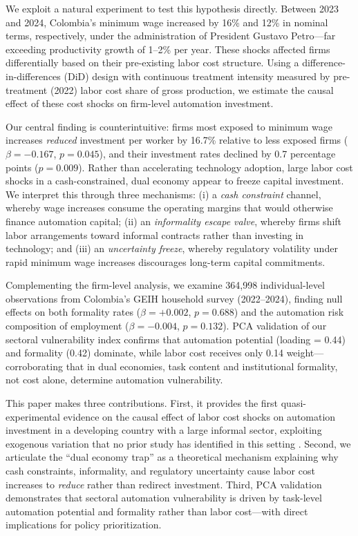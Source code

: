 \documentclass[5p,times,authoryear]{elsarticle}
\begin{document}
We exploit a natural experiment to test this hypothesis directly. Between 2023 and 2024, Colombia's minimum wage increased by 16\% and 12\% in nominal terms, respectively, under the administration of President Gustavo Petro---far exceeding productivity growth of 1--2\% per year. These shocks affected firms differentially based on their pre-existing labor cost structure. Using a difference-in-differences (DiD) design with continuous treatment intensity measured by pre-treatment (2022) labor cost share of gross production, we estimate the causal effect of these cost shocks on firm-level automation investment.

Our central finding is counterintuitive: firms most exposed to minimum wage increases \emph{reduced} investment per worker by 16.7\% relative to less exposed firms ($\beta = -0.167$, $p = 0.045$), and their investment rates declined by 0.7 percentage points ($p = 0.009$). Rather than accelerating technology adoption, large labor cost shocks in a cash-constrained, dual economy appear to freeze capital investment. We interpret this through three mechanisms: (i) a \emph{cash constraint} channel, whereby wage increases consume the operating margins that would otherwise finance automation capital; (ii) an \emph{informality escape valve}, whereby firms shift labor arrangements toward informal contracts rather than investing in technology; and (iii) an \emph{uncertainty freeze}, whereby regulatory volatility under rapid minimum wage increases discourages long-term capital commitments.

Complementing the firm-level analysis, we examine 364,998 individual-level observations from Colombia's GEIH household survey (2022--2024), finding null effects on both formality rates ($\beta = +0.002$, $p = 0.688$) and the automation risk composition of employment ($\beta = -0.004$, $p = 0.132$). PCA validation of our sectoral vulnerability index confirms that automation potential (loading = 0.44) and formality (0.42) dominate, while labor cost receives only 0.14 weight---corroborating that in dual economies, task content and institutional formality, not cost alone, determine automation vulnerability.

This paper makes three contributions. First, it provides the first quasi-experimental evidence on the causal effect of labor cost shocks on automation investment in a developing country with a large informal sector, exploiting exogenous variation that no prior study has identified in this setting \citep{graetz2018, koch2021, bid2023, morales2023risk}. Second, we articulate the ``dual economy trap'' as a theoretical mechanism explaining why cash constraints, informality, and regulatory uncertainty cause labor cost increases to \emph{reduce} rather than redirect investment. Third, PCA validation demonstrates that sectoral automation vulnerability is driven by task-level automation potential and formality rather than labor cost---with direct implications for policy prioritization.
\end{document}
